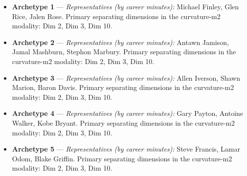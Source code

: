 \begin{itemize}
\item \textbf{Archetype 1} --- \emph{Representatives (by career minutes):} Michael Finley, Glen Rice, Jalen Rose. Primary separating dimensions in the curvature-m2 modality: Dim 2, Dim 3, Dim 10.
\item \textbf{Archetype 2} --- \emph{Representatives (by career minutes):} Antawn Jamison, Jamal Mashburn, Stephon Marbury. Primary separating dimensions in the curvature-m2 modality: Dim 2, Dim 3, Dim 10.
\item \textbf{Archetype 3} --- \emph{Representatives (by career minutes):} Allen Iverson, Shawn Marion, Baron Davis. Primary separating dimensions in the curvature-m2 modality: Dim 2, Dim 3, Dim 10.
\item \textbf{Archetype 4} --- \emph{Representatives (by career minutes):} Gary Payton, Antoine Walker, Kobe Bryant. Primary separating dimensions in the curvature-m2 modality: Dim 2, Dim 3, Dim 10.
\item \textbf{Archetype 5} --- \emph{Representatives (by career minutes):} Steve Francis, Lamar Odom, Blake Griffin. Primary separating dimensions in the curvature-m2 modality: Dim 2, Dim 3, Dim 10.
\end{itemize}
